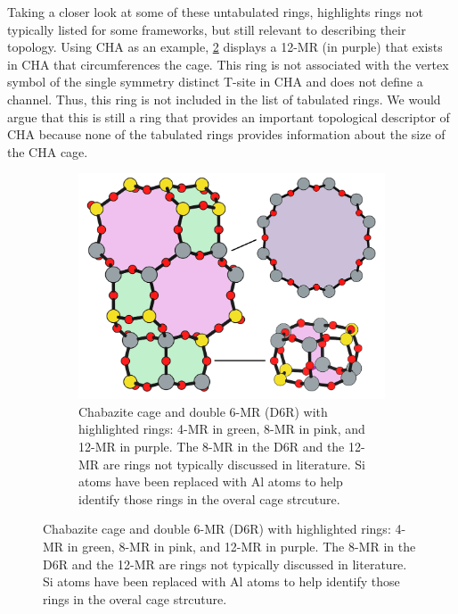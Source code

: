 \documentclass[11pt]{article}
\begin{document}
Taking a closer look at some of these untabulated rings, highlights rings not typically listed for some frameworks, but still relevant to describing their topology. Using CHA as an example, \cref{fig:cha-rings} displays a 12-MR (in purple) that exists in CHA that circumferences the cage. This ring is not associated with the vertex symbol of the single symmetry distinct T-site in CHA and does not define a channel. Thus, this ring is not included in the list of tabulated rings. We would argue that this is still a ring that provides an important topological descriptor of CHA because none of the tabulated rings provides information about the size of the CHA cage. 

\begin{figure}
\begin{figure}[H]
\centering
\includegraphics[width=\textwidth]{figures/chapter-3/cha-all-rings.pdf}
\caption{Chabazite cage and double 6-MR (D6R) with highlighted rings: 4-MR in green, 8-MR in pink, and 12-MR in purple. The 8-MR in the D6R and the 12-MR are rings not typically discussed in literature. Si atoms have been replaced with Al atoms to help identify those rings in the overal cage strcuture. \label{fig:cha-rings}}
\end{figure}
\end{figure}
\end{document}
